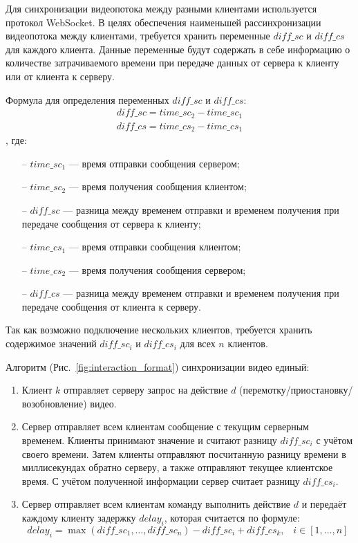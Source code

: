 \documentclass{../includes/TechDoc}
\begin{document}
    Для синхронизации видеопотока между разными клиентами используется протокол WebSocket.
	В целях обеспечения наименьшей рассинхронизации видеопотока между клиентами, требуется хранить переменные \(diff\_sc\) и \(diff\_cs\) для
	каждого клиента.
	Данные переменные будут содержать в себе информацию о количестве затрачиваемого времени при передаче данных от сервера к клиенту или от клиента к серверу.

	Формула для определения переменных \(diff\_sc\) и \(diff\_cs\): \begin{gather*}
	                                                                    diff\_sc = time\_sc_2 - time\_sc_1\\
	                                                                    diff\_cs = time\_cs_2 - time\_cs_1
	\end{gather*}, где:
	\begin{itemize}[noitemsep]
	    \item[--] \(time\_sc_1\) — время отправки сообщения сервером;
	    \item[--] \(time\_sc_2\) — время получения сообщения клиентом;
	    \item[--] \(diff\_sc\) — разница между временем отправки и временем получения при передаче сообщения от сервера к клиенту;
	    \item[--] \(time\_cs_1\) — время отправки сообщения клиентом;
	    \item[--] \(time\_cs_2\) — время получения сообщения сервером;
	    \item[--] \(diff\_cs\) — разница между временем отправки и временем получения при передаче сообщения от клиента к серверу.
	\end{itemize}

	Так как возможно подключение нескольких клиентов, требуется хранить содержимое значений \(diff\_sc_i\) и \(diff\_cs_i\) для всех \(n\) клиентов.

	Алгоритм (Рис.~\ref{fig:interaction_format}) синхронизации видео единый:
	\begin{enumerate}
	    \item Клиент \(k\) отправляет серверу запрос на действие \(d\) (перемотку/приостановку/возобновление) видео.
	    \item Сервер отправляет всем клиентам сообщение с текущим серверным временем.
	    Клиенты принимают значение и считают разницу \(diff\_sc_i\) с учётом своего времени.
	    Затем клиенты отправляют посчитанную разницу времени в миллисекундах обратно серверу, а также отправляют текущее клиентское время.
	    С учётом полученной информации сервер считает разницу \(diff\_cs_i\).
	    \item Сервер отправляет всем клиентам команду выполнить действие \(d\) и передаёт каждому клиенту задержку \(delay_i\),
	    которая считается по формуле: \[ delay_i = \max(diff\_sc_1, \ldots, diff\_sc_n) - diff\_sc_i + diff\_cs_k, \;\;\; i \in [1, \ldots, n] \]
	\end{enumerate}
\end{document}
